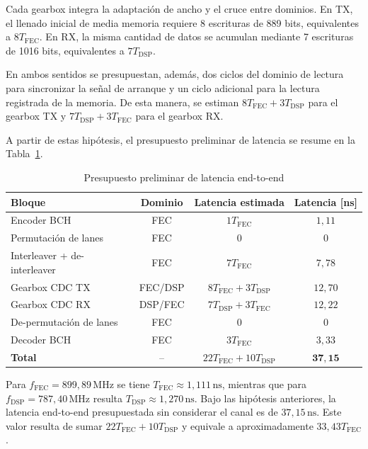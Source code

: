 \documentclass[10pt,a4paper]{article}
\begin{document}
Cada gearbox integra la adaptación de ancho y el cruce entre dominios. En TX, 
el llenado inicial de media memoria requiere 8 escrituras de 889 bits, 
equivalentes a $8T_{\mathrm{FEC}}$. En RX, la misma cantidad de datos 
se acumulan mediante 7 escrituras de 1016 bits, equivalentes a $7T_{\mathrm{DSP}}$.

En ambos sentidos se presupuestan, además, dos ciclos del dominio de lectura
para sincronizar la señal de arranque y un ciclo adicional para la lectura
registrada de la memoria. De esta manera, se estiman
$8T_{\mathrm{FEC}}+3T_{\mathrm{DSP}}$ para el gearbox TX y
$7T_{\mathrm{DSP}}+3T_{\mathrm{FEC}}$ para el gearbox RX.

A partir de estas hipótesis, el presupuesto preliminar de latencia se resume en
la Tabla~\ref{tab:presupuesto-latencia}.

\begin{table}[H]
\centering
\begin{tabular}{lccc}
\hline
\textbf{Bloque} &
\textbf{Dominio} &
\textbf{Latencia estimada} &
\textbf{Latencia [ns]} \\
\hline

Encoder BCH
& FEC
& $1T_{\mathrm{FEC}}$
& $1{,}11$ \\

Permutación de lanes
& FEC
& $0$
& $0$ \\

Interleaver + de-interleaver
& FEC
& $7T_{\mathrm{FEC}}$
& $7{,}78$ \\

Gearbox CDC TX
& FEC/DSP
& $8T_{\mathrm{FEC}}+3T_{\mathrm{DSP}}$
& $12{,}70$ \\

Gearbox CDC RX
& DSP/FEC
& $7T_{\mathrm{DSP}}+3T_{\mathrm{FEC}}$
& $12{,}22$ \\

De-permutación de lanes
& FEC
& $0$
& $0$ \\

Decoder BCH
& FEC
& $3T_{\mathrm{FEC}}$
& $3{,}33$ \\

\hline
\textbf{Total}
& --
& $22T_{\mathrm{FEC}}+10T_{\mathrm{DSP}}$
& $\mathbf{37{,}15}$ \\
\hline
\end{tabular}
\caption{Presupuesto preliminar de latencia end-to-end}
\label{tab:presupuesto-latencia}
\end{table}

Para $f_{\mathrm{FEC}}=899{,}89\,\mathrm{MHz}$ se tiene
$T_{\mathrm{FEC}}\approx1{,}111\,\mathrm{ns}$, mientras que para
$f_{\mathrm{DSP}}=787{,}40\,\mathrm{MHz}$ resulta
$T_{\mathrm{DSP}}\approx1{,}270\,\mathrm{ns}$. Bajo las hipótesis anteriores, la
latencia end-to-end presupuestada sin considerar el canal es de
$37{,}15\,\mathrm{ns}$. Este valor resulta de sumar
$22T_{\mathrm{FEC}}+10T_{\mathrm{DSP}}$ y equivale a aproximadamente
$33{,}43T_{\mathrm{FEC}}$.
\end{document}
